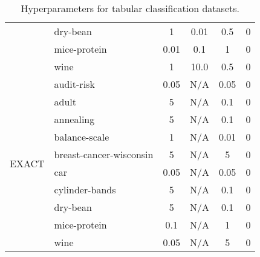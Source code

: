 \documentclass[nohyperref]{article}
\theoremstyle{plain}
\theoremstyle{definition}
\theoremstyle{remark}
\begin{document}
\begin{table*}[t]
\begin{tabular}{l|l|cccc}
 & dry-bean & 1 & 0.01 & 0.5 & 0\\
 & mice-protein & 0.01 & 0.1 & 1 & 0 \\
 & wine & 1 & 10.0 & 0.5 & 0 \\
\hline
\multirow{10}{*}{EXACT} & audit-risk & 0.05 & N/A & 0.05 & 0 \\
 & adult & 5 & N/A & 0.1 & 0 \\
 & annealing & 5 & N/A & 0.1 & 0 \\
 & balance-scale & 1 & N/A & 0.01 & 0 \\
 & breast-cancer-wisconsin & 5 & N/A & 5 & 0 \\
 & car & 0.05 & N/A & 0.05 & 0 \\
 & cylinder-bands & 5 & N/A & 0.1 & 0 \\
 & dry-bean & 5 & N/A & 0.1 & 0 \\
 & mice-protein & 0.1 & N/A & 1 & 0 \\
 & wine & 0.05 & N/A & 5 & 0 \\
\hline
\end{tabular}
\caption{Hyperparameters for tabular classification datasets.}
\label{tab:hopt-tabular}
\end{table*}
\end{document}
